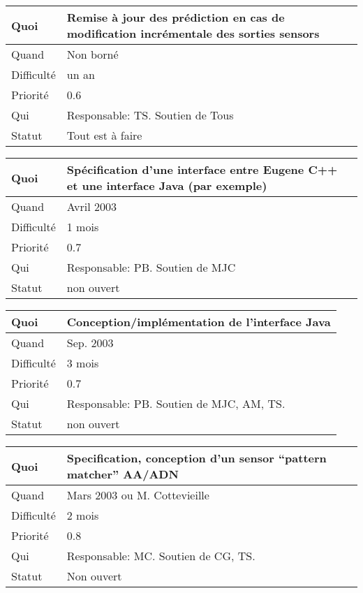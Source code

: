 \documentclass[a4paper,11pt]{article}
\begin{document}
\begin{longtable}{|l|p{7cm}|}\hline
  Quoi & Remise \`a jour des pr\'ediction en cas de modification
  incr\'ementale des sorties sensors\\\hline
  Quand  &  Non born\'e\\\hline
  Difficult\'e &  un an \\\hline
  Priorit\'e &  0.6\\\hline
  Qui & Responsable: TS. Soutien de Tous\\\hline
  Statut & Tout est \`a faire\\\hline
\end{longtable}

\begin{longtable}{|l|p{7cm}|}\hline
  Quoi & Sp\'ecification d'une interface entre Eugene C++ et une interface
Java (par exemple)\\\hline
  Quand  &  Avril 2003\\\hline
  Difficult\'e & 1 mois \\\hline
  Priorit\'e &  0.7\\\hline
  Qui & Responsable: PB. Soutien de MJC\\\hline
  Statut & non ouvert\\\hline
\end{longtable}

\begin{longtable}{|l|p{7cm}|}\hline
  Quoi & Conception/impl\'ementation de l'interface Java\\\hline
  Quand  &  Sep. 2003\\\hline
  Difficult\'e & 3 mois \\\hline
  Priorit\'e &  0.7\\\hline
  Qui & Responsable: PB. Soutien de MJC, AM, TS.\\\hline
  Statut & non ouvert \\\hline
\end{longtable}

\begin{longtable}{|l|p{7cm}|}\hline
  Quoi & Specification, conception d'un sensor ``pattern matcher'' AA/ADN \\\hline
  Quand  &  Mars 2003 ou M. Cottevieille\\\hline
  Difficult\'e &  2 mois\\\hline
  Priorit\'e &  0.8 \\\hline
  Qui & Responsable: MC. Soutien de CG, TS.\\\hline
  Statut & Non ouvert\\\hline
\end{longtable}
\end{document}
